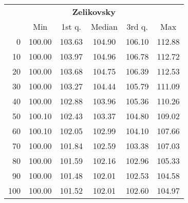 \begin{tabular}{r|ccccc}
  \multicolumn{6}{c}{{\bf Zelikovsky}} \\
  & Min & 1st q. & Median & 3rd q. & Max \\ \hline\hline
  0 & 100.00 & 103.63 & 104.90 & 106.10 & 112.88
\\ 10 & 100.00 & 103.97 & 104.96 & 106.78 & 112.72
\\ 20 & 100.00 & 103.68 & 104.75 & 106.39 & 112.53
\\ 30 & 100.00 & 103.27 & 104.44 & 105.79 & 111.09
\\ 40 & 100.00 & 102.88 & 103.96 & 105.36 & 110.26
\\ 50 & 100.10 & 102.43 & 103.37 & 104.80 & 109.02
\\ 60 & 100.10 & 102.05 & 102.99 & 104.10 & 107.66
\\ 70 & 100.00 & 101.84 & 102.59 & 103.38 & 107.03
\\ 80 & 100.00 & 101.59 & 102.16 & 102.96 & 105.33
\\ 90 & 100.00 & 101.48 & 102.01 & 102.53 & 104.58
\\ 100 & 100.00 & 101.52 & 102.01 & 102.60 & 104.97
\end{tabular}

